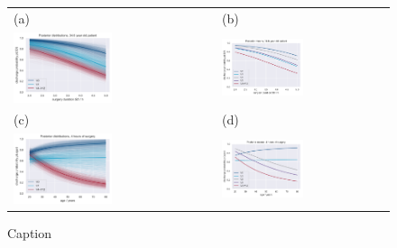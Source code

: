 \documentclass{elsarticle}
\begin{document}
\begin{figure}
    \centering
    \begin{tabular}{ll}
(a)  & (b) \\
\includegraphics[width=0.5\textwidth]{images/DS19fk1_c0__p_LoS__model_B__traces_V0_V4-12__age_mean.png}&
\includegraphics[width=0.5\textwidth]{images/DS19fk1_c0__p_LoS__model_B__mean__age_mean}\\
(c) & (d) \\
\includegraphics[width=0.5\textwidth]{images/DS19fk1_c0__p_age__model_B__traces__LoS_4h.png}&
\includegraphics[width=0.5\textwidth]{images/DS19fk1_c0__p_age__model_B__mean__LoS_4h.pdf}\\
\end{tabular}
    \caption{Caption}
    \label{fig:posterior}
\end{figure}
\end{document}
